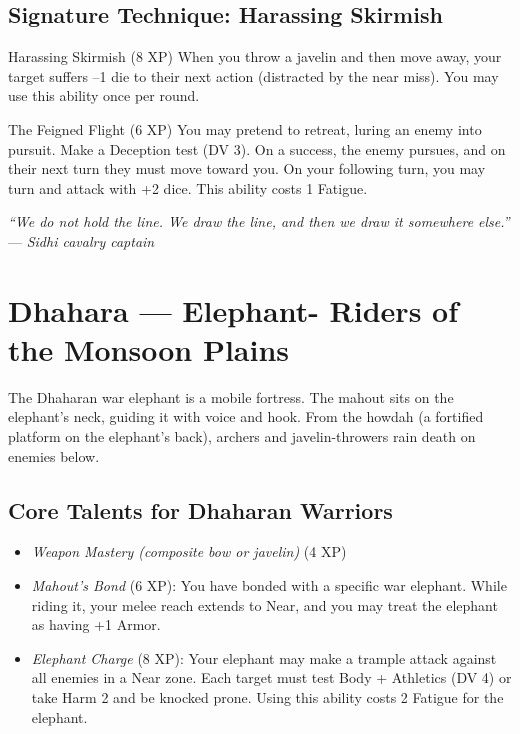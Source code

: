 \documentclass[9pt,a5paper]{extbook}
\begin{document}
\subsection{Signature Technique: Harassing Skirmish}

\begin{talentbox}{Harassing Skirmish (8 XP)}
When you throw a javelin and then move away, your target suffers --1 die to their next action (distracted by the near miss). You may use this ability once per round.
\end{talentbox}

\begin{talentbox}{The Feigned Flight (6 XP)}
You may pretend to retreat, luring an enemy into pursuit. Make a Deception test (DV 3). On a success, the enemy pursues, and on their next turn they must move toward you. On your following turn, you may turn and attack with +2 dice. This ability costs 1 Fatigue.
\end{talentbox}

\vspace{0.2cm}
\noindent\textit{``We do not hold the line. We draw the line, and then we draw it somewhere else.''}  
\hfill --- \textit{Sidhi cavalry captain}

\clearpage

\section{Dhahara --- Elephant- Riders of the Monsoon Plains}

The Dhaharan war elephant is a mobile fortress. The mahout sits on the elephant's neck, guiding it with voice and hook. From the howdah (a fortified platform on the elephant's back), archers and javelin-throwers rain death on enemies below.

\subsection{Core Talents for Dhaharan Warriors}
\begin{itemize}
    \item \textit{Weapon Mastery (composite bow or javelin)} (4 XP)
    \item \textit{Mahout's Bond} (6 XP): You have bonded with a specific war elephant. While riding it, your melee reach extends to Near, and you may treat the elephant as having +1 Armor.
    \item \textit{Elephant Charge} (8 XP): Your elephant may make a trample attack against all enemies in a Near zone. Each target must test Body + Athletics (DV 4) or take Harm 2 and be knocked prone. Using this ability costs 2 Fatigue for the elephant.
\end{itemize}
\end{document}
